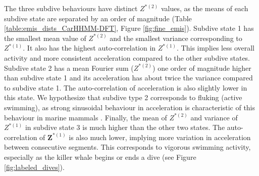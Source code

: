 The three subdive behaviours have distinct $Z^{*(2)}$ values, as the means of each subdive state are separated by an order of magnitude (Table \ref{table:emis_dists_CarHHMM-DFT}, Figure \ref{fig:fine_emis}). 
Subdive state 1 has the smallest mean value of $Z^{*(2)}$ and the smallest variance corresponding to $Z^{*(1)}$. It also has the highest auto-correlation in $Z^{*(1)}$. This implies less overall activity and more consistent acceleration compared to the other subdive states. 
Subdive state 2 has a mean Fourier sum ($Z^{*(2)}$) one order of magnitude higher than subdive state 1 and its acceleration has about twice the variance compared to subdive state 1. The auto-correlation of acceleration is also slightly lower in this state. We hypothesize that subdive type 2 corresponds to fluking (active swimming), as strong sinusoidal behaviour in acceleration is characteristic of this behaviour in marine mammals \citep{Simon:2012}.
Finally, the mean of $Z^{*(2)}$ and variance of $Z^{*(1)}$ in subdive state 3 is much higher than the other two states. The auto-correlation of $\mathbf{Z}^{*(1)}$ is also much lower, implying more variation in acceleration between consecutive segments. This corresponds to vigorous swimming activity, especially as the killer whale begins or ends a dive (see Figure \ref{fig:labeled_dives}). 

